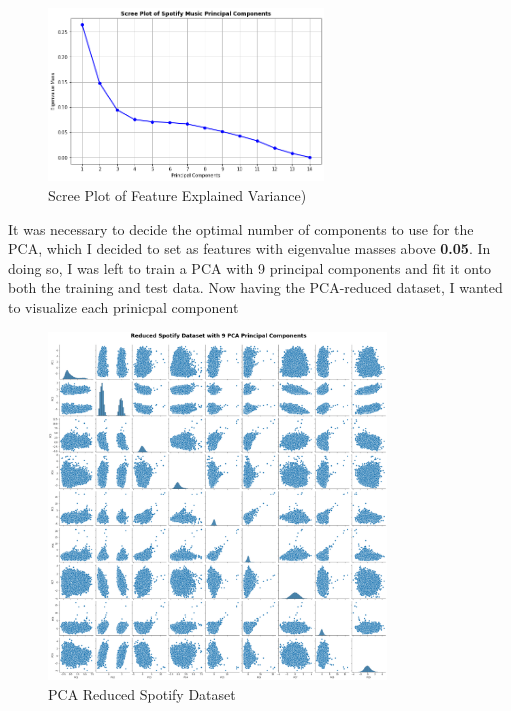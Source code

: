 \documentclass[12pt]{article}
\begin{document}
\begin{figure}[htbp]
  \centering
  \vspace{-0.075cm}
  \includegraphics[width=0.65\textwidth]{pca_scree.png}
  \caption{Scree Plot of Feature Explained Variance)}
  \label{PCA Scree Plot}
\end{figure}

\noindent
It was necessary to decide the optimal number of components to use for the PCA, which I decided to set as features with eigenvalue masses above \textbf{0.05}. In doing so, I was left to train a PCA with 9 principal components and fit it onto both the training and test data. Now having the PCA-reduced dataset, I wanted to visualize each prinicpal component

\begin{figure}[htbp]
  \centering
  \vspace{-0.075cm}
  \includegraphics[width=0.8\textwidth]{9_pca.png}
  \caption{PCA Reduced Spotify Dataset}
  \label{PCA Scree Plot}
\end{figure}
\end{document}
